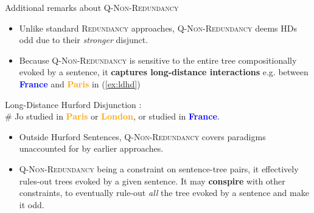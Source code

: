 \documentclass[10pt]{beamer}
\newcommand{\stronger}[1]{\textbf{\textcolor{orange}{#1}}}
\newcommand{\Paris}{\textbf{\textcolor{orange}{Paris}}}
\newcommand{\France}{\textbf{\textcolor{blue}{France}}}
\begin{document}
\begin{frame}{Additional remarks about \textsc{Q-Non-Redundancy}}
	\begin{itemize}
		\item Unlike standard \textsc{Redundancy} approaches, \textsc{Q-Non-Redundancy} deems HDs odd due to their \textit{stronger} disjunct.\pause
		\item Because \textsc{Q-Non-Redundancy} is sensitive to the entire tree compositionally evoked by a sentence, it \textbf{captures long-distance interactions} e.g. between \France{} and \Paris{} in (\ref{ex:ldhd})
	\end{itemize}
		\begin{exe}
			\ex\label{ex:ldhd}{Long-Distance Hurford Disjunction \citep{Marty2022}:\\\# Jo studied in \Paris{} or \stronger{London}, or studied in \France.}
		\end{exe}
	\begin{itemize}\pause
		\item Outside Hurford Sentences, \textsc{Q-Non-Redundancy} covers paradigms unaccounted for by earlier approaches.\pause
		\item \textsc{Q-Non-Redundancy} being a constraint on sentence-tree pairs, it effectively rules-out trees evoked by a given sentence. It may \textbf{conspire} with other constraints, to eventually rule-out \textit{all} the tree evoked by a sentence and make it odd.
	\end{itemize}
\end{frame}
\end{document}
